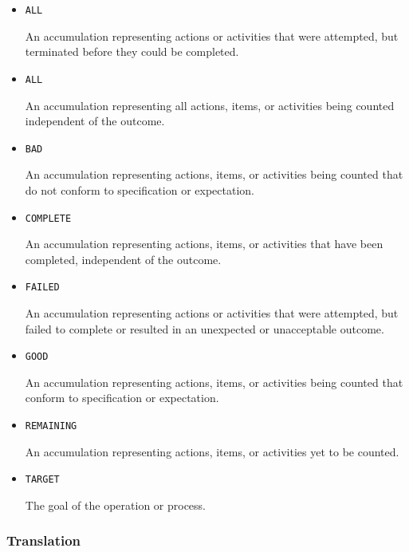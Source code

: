 \begin{itemize}

\item \texttt{ALL}


An accumulation representing actions or activities that were attempted, but terminated before they could be completed.

\item \texttt{ALL}


An accumulation representing all actions, items, or activities being counted independent of the outcome.

\item \texttt{BAD}


An accumulation representing actions, items, or activities being counted that do not conform to specification or expectation.

\item \texttt{COMPLETE}


An accumulation representing actions, items, or activities that have been completed, independent of the outcome.

\item \texttt{FAILED}


An accumulation representing actions or activities that were attempted, but failed to
complete or resulted in an unexpected or unacceptable outcome.

\item \texttt{GOOD}


An accumulation representing actions, items, or activities being counted that conform to specification or expectation.

\item \texttt{REMAINING}


An accumulation representing actions, items, or activities yet to be counted.

\item \texttt{TARGET}


The goal of the operation or process.


\end{itemize}











\subsubsection{Translation}
\label{sec:Translation}



